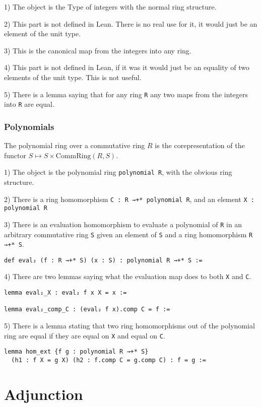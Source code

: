 \documentclass[12pt]{article} %
\theoremstyle{definition}
\theoremstyle{definition}
\theoremstyle{definition}
\theoremstyle{definition}
\begin{document}
1) The object is the Type of integers with the normal ring structure.

2) This part is not defined in Lean. There is no real use for it, it would just be an element of 
the unit type.

3) This is the canonical map from the integers into any ring.

4) This part is not defined in Lean, if it was it would just be an equality of two 
elements of the unit type. This is not useful.

5) There is a lemma saying that for any ring \lstinline{R} any two maps from the integers into \lstinline{R}
are equal.

\subsubsection{Polynomials}
The polynomial ring over a commutative ring $R$ is the corepresentation of the functor 
$S \mapsto S \times \text{CommRing}(R, S)$.

1) The object is the polynomial ring \lstinline{polynomial R}, with the obvious ring structure.

2) There is a ring homomorphism \lstinline{C : R →+* polynomial R}, and an element 
\lstinline{X : polynomial R}

3) There is an evaluation homomorphism to evaluate a polynomial of \lstinline{R} in 
an arbitrary commutative ring \lstinline{S} given an element of \lstinline{S} and 
a ring homomorphism \lstinline{R →+* S}.
\begin{lstlisting}
def eval₂ (f : R →+* S) (x : S) : polynomial R →+* S :=
\end{lstlisting}

4) There are two lemmas saying what the evaluation map does to both \lstinline{X} and 
\lstinline{C}.
\begin{lstlisting}
lemma eval₂_X : eval₂ f x X = x :=

lemma eval₂_comp_C : (eval₂ f x).comp C = f :=
\end{lstlisting}

5) There is a lemma stating that two ring homomorphisms out of the polynomial ring are 
equal if they are equal on \lstinline{X} and equal on \lstinline{C}.
\begin{lstlisting}
lemma hom_ext {f g : polynomial R →+* S} 
  (h1 : f X = g X) (h2 : f.comp C = g.comp C) : f = g :=
\end{lstlisting}

\section{Adjunction}
\end{document}
